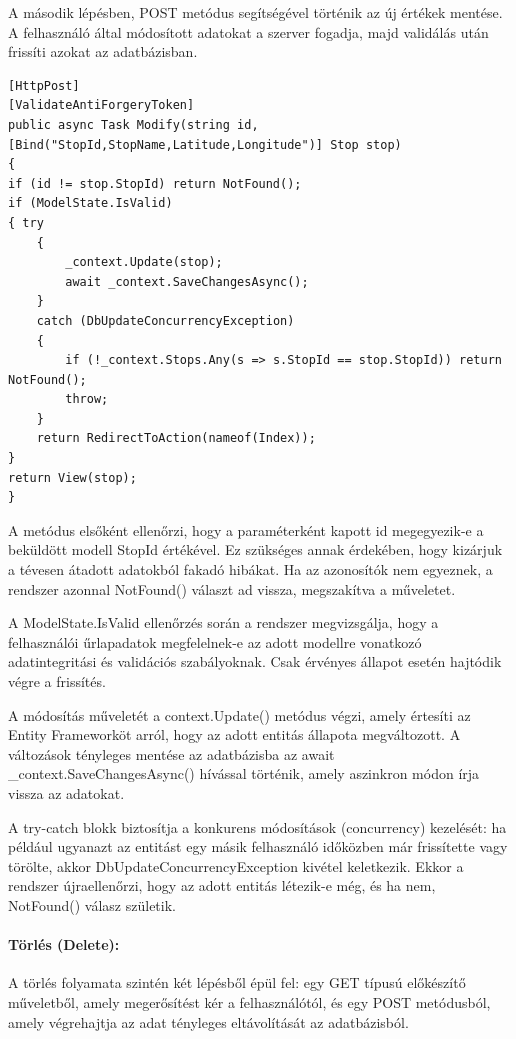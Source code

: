 A második lépésben, POST metódus segítségével történik az új értékek mentése. A felhasználó által módosított adatokat a szerver fogadja, majd validálás után frissíti azokat az adatbázisban.

\begin{lstlisting}
[HttpPost]
[ValidateAntiForgeryToken]
public async Task Modify(string id, [Bind("StopId,StopName,Latitude,Longitude")] Stop stop)
{
if (id != stop.StopId) return NotFound();
if (ModelState.IsValid)
{ try
    {
        _context.Update(stop);
        await _context.SaveChangesAsync();
    }
    catch (DbUpdateConcurrencyException)
    {
        if (!_context.Stops.Any(s => s.StopId == stop.StopId)) return NotFound();
        throw;
    }
    return RedirectToAction(nameof(Index));
}
return View(stop);
}
\end{lstlisting}

A metódus elsőként ellenőrzi, hogy a paraméterként kapott id megegyezik-e a beküldött modell StopId értékével. Ez szükséges annak érdekében, hogy kizárjuk a tévesen átadott adatokból fakadó hibákat. Ha az azonosítók nem egyeznek, a rendszer azonnal NotFound() választ ad vissza, megszakítva a műveletet.

A ModelState.IsValid ellenőrzés során a rendszer megvizsgálja, hogy a felhasználói űrlapadatok megfelelnek-e az adott modellre vonatkozó adatintegritási és validációs szabályoknak. Csak érvényes állapot esetén hajtódik végre a frissítés.

A módosítás műveletét a context.Update() metódus végzi, amely értesíti az Entity Frameworköt arról, hogy az adott entitás állapota megváltozott. A változások tényleges mentése az adatbázisba az await \_context.SaveChangesAsync() hívással történik, amely aszinkron módon írja vissza az adatokat.

A try-catch blokk biztosítja a konkurens módosítások (concurrency) kezelését: ha például ugyanazt az entitást egy másik felhasználó időközben már frissítette vagy törölte, akkor DbUpdateConcurrencyException kivétel keletkezik. Ekkor a rendszer újraellenőrzi, hogy az adott entitás létezik-e még, és ha nem, NotFound() válasz születik.

\paragraph{Törlés (Delete):}
A törlés folyamata szintén két lépésből épül fel: egy GET típusú előkészítő műveletből, amely megerősítést kér a felhasználótól, és egy POST metódusból, amely végrehajtja az adat tényleges eltávolítását az adatbázisból.

